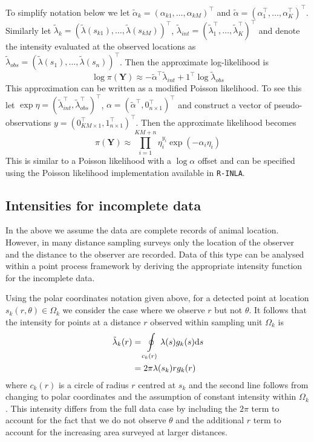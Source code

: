 \documentclass[preprint,12pt]{elsarticle}
\newcommand{\bm}{\boldsymbol}  %
\newcommand{\tl}{\tilde{\lambda}}   %
\begin{document}
To simplify notation below we let $\tilde{\alpha}_{k} = (\alpha_{k1}, \ldots, \alpha_{kM})^\intercal$ and $\tilde{\alpha} = (\alpha_1^\intercal, \ldots, \alpha_K^\intercal)^\intercal$.  Similarly let $\tl_k = (\tl(s_{k1}), \ldots, \tl(s_{kM}))^\intercal$, $\tl_{int} = (\tl_1^\intercal, \ldots, \tl_K^\intercal)^\intercal$ and denote the intensity evaluated at the observed locations as $\tl_{obs} = (\tl(s_1), \ldots, \tl(s_n))^\intercal$.  Then the approximate log-likelihood is
\begin{equation}
\label{approx-log-likelihood}
	\log \pi(\bm{Y}) \approx - \tilde{\alpha}^\intercal \tl_{int} + 1^\intercal\log\tl_{obs}
\end{equation}
This approximation can be written as a modified Poisson likelihood.  To see this let $\exp \eta = (\tl_{int}^\intercal, \tl_{obs}^\intercal)^\intercal$,
$\alpha = (\tilde{\alpha}^\intercal, 0_{n \times 1}^\intercal)^\intercal$ and construct a vector of pseudo-observations $y = (0_{KM\times 1}^\intercal, 1_{n \times 1}^\intercal)^\intercal$.  Then the approximate likelihood becomes
\begin{equation}
\pi(\bm{Y}) \approx \prod_{i=1}^{KM + n} \eta_i^{y_i}\exp(-\alpha_i\eta_i)
\end{equation}
This is similar to a Poisson likelihood with a $\log\alpha$ offset and can be specified using the Poisson likelihood implementation available in \texttt{R-INLA}.


\subsection{Intensities for incomplete data}

In the above we assume the data are complete records of animal location.  However, in many distance sampling surveys only the location of the observer and the distance to the observer are recorded.  Data of this type can be analysed within a point process framework by deriving the appropriate intensity function for the incomplete data.

Using the polar coordinates notation given above, for a detected point at location $s_k(r, \theta) \in \Omega_k$ we consider the case where we observe $r$ but not $\theta$.  It follows that the intensity for points at a distance $r$ observed within sampling unit $\Omega_k$ is
\begin{align}
\label{intensity-incomplete}
\tl_k(r) &= \oint\displaylimits_{c_k(r)} \lambda(s)g_k(s)\mathrm{d}s \nonumber \\
&= 2\pi\lambda(s_k)rg_k(r)
\end{align}
 where $c_k(r)$ is a circle of radius $r$ centred at $s_k$ and the second line follows from changing to polar coordinates and the assumption of constant intensity within $\Omega_k$.  This intensity differs from the full data case by including the $2\pi$  term to account for the fact that we do not observe $\theta$ and the additional $r$ term to account for the increasing area surveyed at larger distances.
\end{document}
